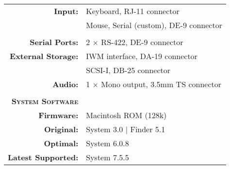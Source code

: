 \begin{tabular}{ r p{6in} }
\textbf{Input:} & Keyboard, RJ-11 connector \\
~ & Mouse, Serial (custom), DE-9 connector \\
\\
\textbf{Serial Ports:} & 2 \(\times\) RS-422, DE-9 connector \\
\textbf{External Storage:} & IWM interface, DA-19 connector \\
~ & SCSI-I, DB-25 connector \\
\textbf{Audio:} & 1 \(\times\) Mono output, 3.5mm TS connector \\
\\
\textbf{\textsc{System Software}} & ~ \\
\textbf{Firmware:} & Macintosh ROM (128k) \\
\textbf{Original:} & System 3.0 | Finder 5.1 \\
\textbf{Optimal:} & System 6.0.8 \\
\textbf{Latest Supported:} & System 7.5.5 \\
\end{tabular}